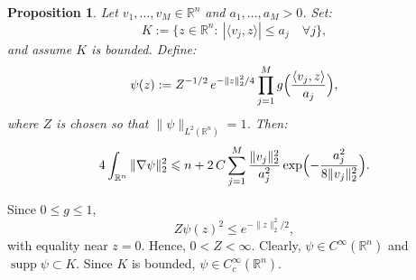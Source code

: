 \documentclass[12pt,reqno]{amsart}
\makeatletter
\def\le{\leqslant}
\def\le{\leqslant}
\newtheorem{proposition}[theorem]{Proposition}
\theoremstyle{remark}
\renewenvironment{proof}[1][\proofname]{%
  \par\vspace{\topsep}%
  \normalfont\topsep6\p@\@plus6\p@\relax
  \trivlist
  \item[\hskip\labelsep\itshape #1\@addpunct{.}]\ignorespaces
}{%
  \endtrivlist
}
\numberwithin{equation}{section}
\def \R {\mathbb{R}}
\makeatother
\begin{document}
\begin{proposition}\label{slabs}
Let \(v_1,\ldots,v_M\in\R^n\) and \(a_1,\ldots,a_M>0\). Set:
\[
K:=\bigl\{z\in\R^n:\ |\langle v_j,z\rangle|\le a_j\quad \forall j\bigr\},
\]
and assume \(K\) is bounded. Define:
\[
\psi(z):=Z^{-1/2}\,e^{-\|z\|_2^2/4}\prod_{j=1}^M
g\Bigl(\frac{\langle v_j,z\rangle}{a_j}\Bigr),
\]
where \(Z\) is chosen so that \(\|\psi\|_{L^2(\R^n)}=1\).
Then:
\begin{equation}\label{eq:slab-fisher}
4\int_{\R^n}\|\nabla\psi\|_2^2
\le
n+2\,C\sum_{j=1}^M\frac{\|v_j\|_2^2}{a_j^2}
\exp\Bigl(-\frac{a_j^2}{8\|v_j\|_2^2}\Bigr).
\end{equation}
\end{proposition}

\begin{proof}
Since \(0 \le g \le 1\), 
\[
Z\psi(z)^2\le e^{-\|z\|_2^2/2},
\]
with equality near \(z=0\). Hence, \(0<Z<\infty\). Clearly, \(\psi\in C^\infty(\R^n)\) and \(\operatorname{supp}\psi\subset K\). Since \(K\) is bounded, \(\psi\in C_c^\infty(\R^n)\).
\smallskip%


\end{proof}
\end{document}
